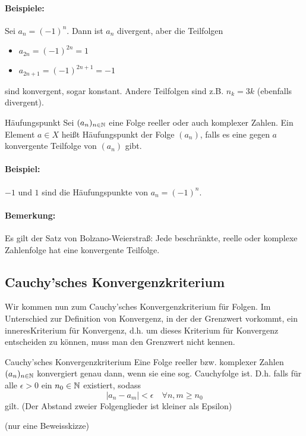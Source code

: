 \paragraph{Beispiele:}
Sei $a_n=(-1)^n$. Dann ist $a_n$ divergent, aber die Teilfolgen
\begin{itemize}
	\item $a_{2n}=(-1)^{2n}=1$
	\item $a_{2n+1}=(-1)^{2n+1}=-1$
\end{itemize}
sind konvergent, sogar konstant. Andere Teilfolgen sind z.B. $n_k=3k$ (ebenfalls divergent).

\begin{definition}{Häufungspunkt}
	Sei $(a_n)_{n\in\mathbb{N}}$ eine Folge reeller oder auch komplexer Zahlen. Ein Element $a\in X$ heißt Häufungspunkt der Folge $(a_n)$, falls es eine gegen $a$ konvergente Teilfolge von $(a_n)$ gibt.
\end{definition}
\paragraph{Beispiel:}
$-1$ und $1$ sind die Häufungspunkte von $a_n=(-1)^n$.

\paragraph{Bemerkung:}
Es gilt der Satz von Bolzano-Weierstraß: Jede beschränkte, reelle oder komplexe Zahlenfolge hat eine konvergente Teilfolge.

\subsection{Cauchy'sches Konvergenzkriterium}
Wir kommen nun zum Cauchy'sches Konvergenzkriterium für Folgen. Im Unterschied zur Definition von Konvergenz, in der der Grenzwert vorkommt, ein \glqq inneres\grqq Kriterium für Konvergenz, d.h. um dieses Kriterium für Konvergenz entscheiden zu können, muss man den Grenzwert nicht kennen.

\begin{satz}{Cauchy'sches Konvergenzkriterium}
	Eine Folge reeller bzw. komplexer Zahlen $(a_n)_{n\in\mathbb{N}}$ konvergiert genau dann, wenn sie eine sog. Cauchyfolge ist. D.h. falls für alle $\epsilon>0$ ein $n_0\in\mathbb{N}$ existiert, sodass
	\begin{equation*}
		|a_n-a_m|<\epsilon \quad\forall n,m\geq n_0
	\end{equation*}
	gilt. (Der Abstand zweier Folgenglieder ist kleiner als Epsilon)
\end{satz}
\beweis
(nur eine Beweisskizze)

